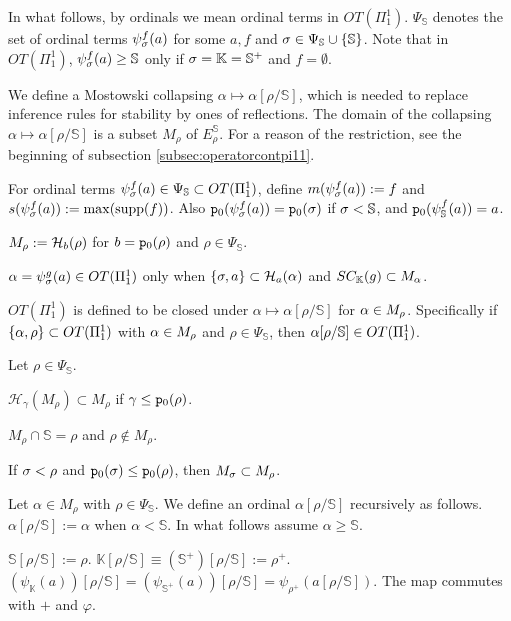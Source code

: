 \documentclass{article}
\newcommand{\mS}{\mathbb{S}}
\newcommand{\mK}{\mathbb{K}}
\begin{document}
In what follows, by ordinals we mean ordinal terms in $OT(\Pi^{1}_{1})$.
$\Psi_{\mS}$ denotes the set of ordinal terms $\psi_{\sigma}^{f}(a)$ for some
$a,f$ and $\sig\in\Psi_{\mS}\cup\{\mS\}$.
Note that in $OT(\Pi^{1}_{1})$,
$\psi_{\sig}^{f}(a)\geq\mS$ only if $\sig=\mK=\mS^{+}$ and $f=\emptyset$.

We define a Mostowski collapsing $\alpha\mapsto\alpha[\rho/\mS]$,
which is needed to replace inference rules for stability by ones of reflections.
The domain of the collapsing $\alpha\mapsto\alpha[\rho/\mS]$ is a subset
$M_{\rho}$ of $E^{\mS}_{\rho}$.
For a reason of the restriction, see the beginning of subsection \ref{subsec:operatorcontpi11}.

\bdf
{\rm
For ordinal terms $\psi_{\sig}^{f}(a)\in \Psi_{\mS}\subset OT(\Pi^{1}_{1})$,
define
$m(\psi_{\sigma}^{f}(a)):=f$ and $s(\psi_{\sigma}^{f}(a)):=\max({\rm supp}(f))$.
Also
${\tt p}_{0}(\psi_{\sigma}^{f}(a))={\tt p}_{0}(\sigma)$ if $\sig<\mS$, and
${\tt p}_{0}(\psi_{\mS}^{f}(a))=a$.
}
\edf

\bdf
$M_{\rho}:={\cal H}_{b}(\rho)$ for $b={\tt p}_{0}(\rho)$ and $\rho\in\Psi_{\mS}$.
\edf

$\alpha=\psi_{\sigma}^{g}(a)\in OT(\Pi^{1}_{1})$ only when
$\{\sigma,a\}\subset {\cal H}_{a}(\alpha)$ and
$SC_{\mK}(g)\subset M_{\alp}$.



$OT(\Pi^{1}_{1})$ is defined to be closed under
$\alpha\mapsto\alpha[\rho/\mS]$ for $\alpha\in M_{\rho}$.
Specifically if $\{\alpha,\rho\}\subset OT(\Pi^{1}_{1})$ with
$\alpha\in M_{\rho}$ and $\rho\in\Psi_{\mS}$, then
$\alp[\rho/\mS]\in OT(\Pi^{1}_{1})$.










\bprp\label{prp:EK2pi11}
Let $\rho\in\Psi_{\mS}$.
\benu
\item\label{prp:EK2.1}
$\mathcal{H}_{\gamma}(M_{\rho})\subset M_{\rho}$ 
if $\gamma\leq{\tt p}_{0}(\rho)$.


\item\label{prp:EK2.2}
$M_{\rho}\cap\mS=\rho$ and $\rho\not\in M_{\rho}$.

\item\label{prp:EK2.3}
If $\sigma<\rho$ and ${\tt p}_{0}(\sigma)\leq {\tt p}_{0}(\rho)$, then
$M_{\sigma}\subset M_{\rho}$.
\eenu
\eprp




\bdf\label{df:Mostwskicollaps}
{\rm
Let $\alpha\in M_{\rho}$ with $\rho\in \Psi_{\mS}$.
We define an ordinal $\alpha[\rho/\mS]$ recursively as follows.
$\alpha[\rho/\mS]:=\alpha$ when $\alpha<\mathbb{S}$.
In what follows assume $\alpha\geq\mathbb{S}$.

$\mathbb{S}[\rho/\mS]:=\rho$.
$\mK[\rho/\mS]\equiv(\mathbb{S}^{+})[\rho/\mS]:=\rho^{+}$.
$\left(\psi_{\mK}(a)\right)[\rho/\mS]=\left(\psi_{\mathbb{S}^{+}}(a)\right)[\rho/\mS]=\psi_{\rho^{+}}(a[\rho/\mS])$.
The map commutes with $+$ and $\varphi$.
}
\edf
\end{document}
